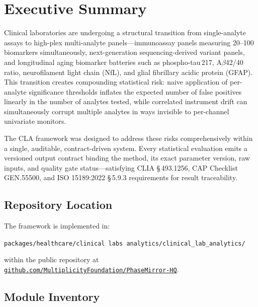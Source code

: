 \documentclass[11pt,a4paper]{article}
\begin{document}
\section{Executive Summary}
\label{sec:exec}

Clinical laboratories are undergoing a structural transition from single-analyte
assays to high-plex multi-analyte panels---immunoassay panels measuring 20--100
biomarkers simultaneously, next-generation sequencing-derived variant panels, and
longitudinal aging biomarker batteries such as phospho-tau\,217, A$\beta$42/40
ratio, neurofilament light chain (NfL), and glial fibrillary acidic protein
(GFAP). This transition creates compounding statistical risk: naive application
of per-analyte significance thresholds inflates the expected number of false
positives linearly in the number of analytes tested, while correlated instrument
drift can simultaneously corrupt multiple analytes in ways invisible to
per-channel univariate monitors.

The CLA framework was designed to address these risks comprehensively within
a single, auditable, contract-driven system. Every statistical evaluation emits
a versioned output contract binding the method, its exact parameter version, raw
inputs, and quality gate status---satisfying CLIA \S\,493.1256, CAP Checklist
GEN.55500, and ISO 15189:2022 \S\,5.9.3 requirements for result
traceability.

\subsection*{Repository Location}
The framework is implemented in:
\begin{center}
\texttt{packages/healthcare/clinical labs analytics/clinical\_lab\_analytics/}
\end{center}
within the public repository at
\href{https://github.com/MultiplicityFoundation/PhaseMirror-HQ}{%
\texttt{github.com/MultiplicityFoundation/PhaseMirror-HQ}}.

\subsection*{Module Inventory}
\end{document}
